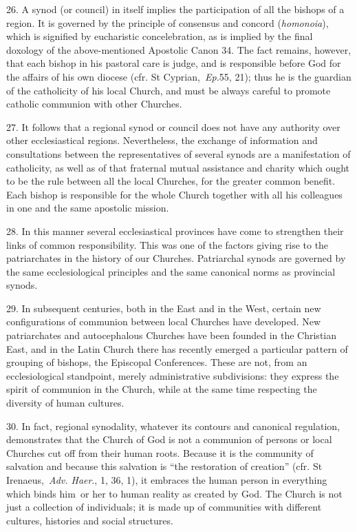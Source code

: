 26. A synod (or council) in itself implies the participation of all the
bishops of a region. It is governed by the principle of consensus and
concord (\emph{homonoia}), which is signified by eucharistic
concelebration, as is implied by the final doxology of the
above-mentioned Apostolic Canon 34. The fact remains, however, that each
bishop in his pastoral care is judge, and is responsible before God for
the affairs of his own diocese (cfr. St Cyprian,~\emph{Ep.}55, 21); thus
he is the guardian of the catholicity of his local Church, and must be
always careful to promote catholic communion with other Churches.

27. It follows that a regional synod or council does not have any
authority over other ecclesiastical regions. Nevertheless, the exchange
of information and consultations between the representatives of several
synods are a manifestation of catholicity, as well as of that fraternal
mutual assistance and charity which ought to be the rule between all the
local Churches, for the greater common benefit. Each bishop is
responsible for the whole Church together with all his colleagues in one
and the same apostolic mission.

28. In this manner several ecclesiastical provinces have come to
strengthen their links of common responsibility. This was one of the
factors giving rise to the patriarchates in the history of our Churches.
Patriarchal synods are governed by the same ecclesiological principles
and the same canonical norms as provincial synods.

29. In subsequent centuries, both in the East and in the West, certain
new configurations of communion between local Churches have developed.
New patriarchates and autocephalous Churches have been founded in the
Christian East, and in the Latin Church there has recently emerged a
particular pattern of grouping of bishops, the Episcopal Conferences.
These are not, from an ecclesiological standpoint, merely administrative
subdivisions: they express the spirit of communion in the Church, while
at the same time respecting the diversity of human cultures.

30. In fact, regional synodality, whatever its contours and canonical
regulation, demonstrates that the Church of God is not a communion of
persons or local Churches cut off from their human roots. Because it is
the community of salvation and because this salvation is ``the
restoration of creation'' (cfr. St Irenaeus,~\emph{Adv. Haer}., 1, 36,
1), it embraces the human person in everything which binds him\emph{~}or
her to human reality as created by God. The Church is not just a
collection of individuals; it is made up of communities with different
cultures, histories and social structures.

